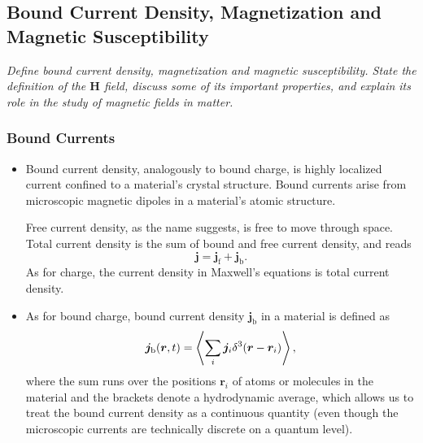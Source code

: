 \documentclass[11pt, a4paper]{article}
\renewcommand{\vec}[1]{\bm{#1}} %
\renewcommand{\r}{\vec{r}}
\renewcommand{\H}{\vec{H}}  %
\renewcommand{\j}{\vec{j}}  %
\begin{document}
    
    
\subsection{Bound Current Density, Magnetization and Magnetic Susceptibility}
\textit{Define bound current density, magnetization and magnetic susceptibility. State the definition of the $ \H $ field, discuss some of its important properties, and explain its role in the study of magnetic fields in matter.}

\subsubsection{Bound Currents}
\begin{itemize}

    \item Bound current density, analogously to bound charge, is highly localized current confined to a material's crystal structure. Bound currents arise from microscopic magnetic dipoles in a material's atomic structure. 

    Free current density, as the name suggests, is free to move through space. Total current density is the sum of bound and free current density, and reads
    \begin{equation*}
        \j = \j_{\text{f}} + \j_{\text{b}}.
    \end{equation*}
    As for charge, the current density in Maxwell's equations is total current density.


	\item As for bound charge, bound current density $ \j_{\text{b}} $ in a material is defined as
	\begin{equation*}
		\j_{\text{b}}(\r, t) = \ev{\sum_{i}\j_{i}\delta^{3}(\r - \r_{i})},
	\end{equation*}
    where the sum runs over the positions $ \r_{i} $ of atoms or molecules in the material and the brackets denote a hydrodynamic average, which allows us to treat the bound current density as a continuous quantity (even though the microscopic currents are technically discrete on a quantum level).

\end{itemize}
\end{document}
